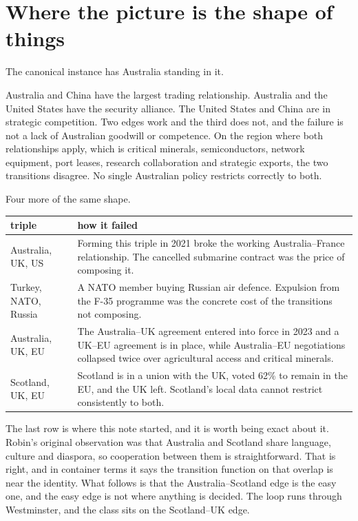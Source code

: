 \documentclass[11pt,a4paper]{article}
\begin{document}
\section{Where the picture is the shape of things}

The canonical instance has Australia standing in it.

Australia and China have the largest trading relationship. Australia and the
United States have the security alliance. The United States and China are in
strategic competition. Two edges work and the third does not, and the failure is
not a lack of Australian goodwill or competence. On the region where both
relationships apply, which is critical minerals, semiconductors, network
equipment, port leases, research collaboration and strategic exports, the two
transitions disagree. No single Australian policy restricts correctly to both.

Four more of the same shape.

\begin{center}
\begin{tabular}{@{}>{\raggedright\arraybackslash}p{4.0cm}>{\raggedright\arraybackslash}p{9.3cm}@{}}
\toprule
\textbf{triple} & \textbf{how it failed} \\
\midrule
Australia, UK, US
  & Forming this triple in 2021 broke the working Australia--France
    relationship. The cancelled submarine contract was the price of composing
    it. \\
Turkey, NATO, Russia
  & A NATO member buying Russian air defence. Expulsion from the F-35
    programme was the concrete cost of the transitions not composing. \\
Australia, UK, EU
  & The Australia--UK agreement entered into force in 2023 and a UK--EU
    agreement is in place, while Australia--EU negotiations collapsed twice
    over agricultural access and critical minerals. \\
Scotland, UK, EU
  & Scotland is in a union with the UK, voted 62\% to remain in the EU, and the
    UK left. Scotland's local data cannot restrict consistently to both. \\
\bottomrule
\end{tabular}
\end{center}

The last row is where this note started, and it is worth being exact about it.
Robin's original observation was that Australia and Scotland share language,
culture and diaspora, so cooperation between them is straightforward. That is
right, and in container terms it says the transition function on that overlap is
near the identity. What follows is that the Australia--Scotland edge is the easy
one, and the easy edge is not where anything is decided. The loop runs through
Westminster, and the class sits on the Scotland--UK edge.
\end{document}
